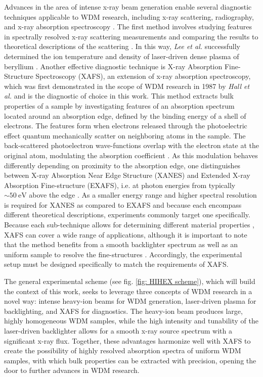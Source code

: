 Advances in the area of intense x-ray beam generation enable several diagnostic techniques applicable to WDM research, including 
x-ray scattering, radiography, and 
x-ray absorption spectroscopy \citep{riley2021warm, 
falk2018experimental}. The first method involves studying features in spectrally resolved x-ray scattering measurements and comparing the results to theoretical descriptions of the scattering \citep{riley2017generation}. In this way, \textit{Lee et al.} successfully determined the ion temperature and density of laser-driven dense plasma of beryllium \citep{lee2009x}. Another effective diagnostic technique is X-ray Absorption Fine-Structure Spectroscopy (XAFS), an extension of x-ray absorption spectroscopy, which was first demonstrated in the scope of WDM research in 1987 by \textit{Hall et al.} \citep{hall1988experimental} and is the diagnostic of choice in this work. This method extracts bulk properties of a sample by investigating features of an absorption spectrum located around an absorption edge, defined by the binding energy of a shell of electrons. The features form when electrons released through the photoelectric effect quantum mechanically scatter on neighboring atoms in the sample. The back-scattered photoelectron wave-functions overlap with the electron state at the original atom, modulating the absorption coefficient \citep{newville2014fundamentals}. As this modulation behaves differently depending on proximity to the absorption edge, one distinguishes between X-ray Absorption Near Edge Structure (XANES) and Extended X-ray Absorption Fine-structure (EXAFS), i.e. at photon energies from typically $\sim \SI{50}{\electronvolt}$ above the edge \citep{levy2009x, peyrusse2009k}. As a smaller energy range and higher spectral resolution is required for XANES as compared to EXAFS and because each encompass different theoretical descriptions, experiments commonly target one specifically. Because each sub-technique allows for determining different material properties \citep{riley2021warm}, XAFS can cover a wide range of applications, although it is important to note that the method benefits from a smooth backlighter spectrum as well as an uniform sample to resolve the fine-structures \citep{riley2017generation}. Accordingly, the experimental setup must be designed specifically to match the requirements of XAFS.

The general experimental scheme (see fig. \ref{fig: HIHEX scheme}), which will build the context of this work, seeks to leverage three concepts of WDM research in a novel way: intense heavy-ion beams for WDM generation, laser-driven plasma for backlighting, and XAFS for diagnostics. The heavy-ion beam produces large, highly homogeneous WDM samples, while the high intensity and tunability of the laser-driven backlighter allows for a smooth x-ray source spectrum with a significant x-ray flux. Together, these advantages harmonize well with XAFS to create the possibility of highly resolved absorption spectra of uniform WDM samples, with which bulk properties can be extracted with precision, opening the door to further advances in WDM research. 

